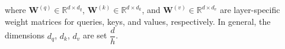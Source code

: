\noindent where $\bm{W}^{(q)} \in \mathbb{R}^{d \times d_q}$, $\bm{W}^{(k)} \in \mathbb{R}^{d \times d_k}$, and $\bm{W}^{(v)} \in \mathbb{R}^{d \times d_v}$ are layer-specific weight matrices for queries, keys, and values, respectively. In general, the dimensions $d_q$, $d_k$, $d_v$ are set $\dfrac{d}{h}$.






